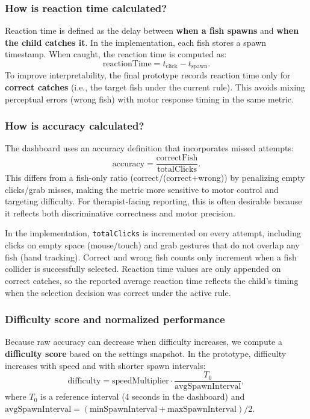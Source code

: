 \documentclass[12pt]{article}
\begin{document}
\subsubsection*{How is reaction time calculated?}
Reaction time is defined as the delay between \textbf{when a fish spawns} and \textbf{when the child catches it}. In the implementation, each fish stores a spawn timestamp. When caught, the reaction time is computed as:
\[
\text{reactionTime} = t_{\text{click}} - t_{\text{spawn}}.
\]
To improve interpretability, the final prototype records reaction time only for \textbf{correct catches} (i.e., the target fish under the current rule). This avoids mixing perceptual errors (wrong fish) with motor response timing in the same metric.

\subsubsection*{How is accuracy calculated?}
The dashboard uses an accuracy definition that incorporates missed attempts:
\[
\text{accuracy} = \frac{\text{correctFish}}{\text{totalClicks}}.
\]
This differs from a fish-only ratio (correct/(correct+wrong)) by penalizing empty clicks/grab misses, making the metric more sensitive to motor control and targeting difficulty. For therapist-facing reporting, this is often desirable because it reflects both discriminative correctness and motor precision.

In the implementation, \texttt{totalClicks} is incremented on every attempt, including clicks on empty space (mouse/touch) and grab gestures that do not overlap any fish (hand tracking). Correct and wrong fish counts only increment when a fish collider is successfully selected. Reaction time values are only appended on correct catches, so the reported average reaction time reflects the child's timing when the selection decision was correct under the active rule.

\subsubsection*{Difficulty score and normalized performance}
Because raw accuracy can decrease when difficulty increases, we compute a \textbf{difficulty score} based on the settings snapshot. In the prototype, difficulty increases with speed and with shorter spawn intervals:
\[
\text{difficulty} = \text{speedMultiplier} \cdot \frac{T_0}{\text{avgSpawnInterval}},
\]
where $T_0$ is a reference interval (4 seconds in the dashboard) and $\text{avgSpawnInterval} = ( \text{minSpawnInterval} + \text{maxSpawnInterval} )/2$.
\end{document}
